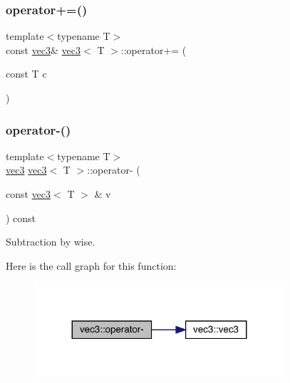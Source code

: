 \mbox{\label{structvec3_ad87cc5752847a9ad05adba9c3d881324}} 
\subsubsection{\texorpdfstring{operator+=()}{operator+=()}\hspace{0.1cm}{\footnotesize\ttfamily [2/2]}}
{\footnotesize\ttfamily template$<$typename T$>$ \\
const \mbox{\hyperlink{structvec3}{vec3}}\& \mbox{\hyperlink{structvec3}{vec3}}$<$ T $>$\+::operator+= (\begin{DoxyParamCaption}\item[{const T}]{c }\end{DoxyParamCaption})\hspace{0.3cm}{\ttfamily [inline]}}

\mbox{\label{structvec3_a62ca43535073d9711fe179e26a412e32}} 
\subsubsection{\texorpdfstring{operator-\/()}{operator-()}\hspace{0.1cm}{\footnotesize\ttfamily [1/3]}}
{\footnotesize\ttfamily template$<$typename T$>$ \\
\mbox{\hyperlink{structvec3}{vec3}} \mbox{\hyperlink{structvec3}{vec3}}$<$ T $>$\+::operator-\/ (\begin{DoxyParamCaption}\item[{const \mbox{\hyperlink{structvec3}{vec3}}$<$ T $>$ \&}]{v }\end{DoxyParamCaption}) const\hspace{0.3cm}{\ttfamily [inline]}}



Subtraction by wise. 

Here is the call graph for this function\+:\nopagebreak
\begin{figure}[H]
\begin{center}
\leavevmode
\includegraphics[width=263pt]{structvec3_a62ca43535073d9711fe179e26a412e32_cgraph}
\end{center}
\end{figure}
\mbox{\label{structvec3_a4c45d24dd69ba07e484e2951933d2f97}} 
